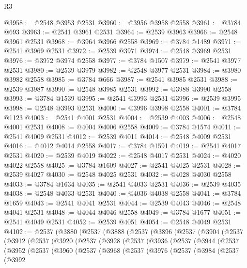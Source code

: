 \begin{lexlean}{R3}
\begin{coremodule}
@3958 := @2548 @3953 @2531
@3960 := @3956 @3958 @2558
@3961 := @3784 @693
@3963 := @2541 @3961 @2531
@3964 := @2539 @3963
@3966 := @2548 @3961 @2531
@3968 := @3964 @3966 @2558
@3969 := @3784 @1489
@3971 := @2541 @3969 @2531
@3972 := @2539 @3971
@3974 := @2548 @3969 @2531
@3976 := @3972 @3974 @2558
@3977 := @3784 @1507
@3979 := @2541 @3977 @2531
@3980 := @2539 @3979
@3982 := @2548 @3977 @2531
@3984 := @3980 @3982 @2558
@3985 := @3784 @666
@3987 := @2541 @3985 @2531
@3988 := @2539 @3987
@3990 := @2548 @3985 @2531
@3992 := @3988 @3990 @2558
@3993 := @3784 @1539
@3995 := @2541 @3993 @2531
@3996 := @2539 @3995
@3998 := @2548 @3993 @2531
@4000 := @3996 @3998 @2558
@4001 := @3784 @1123
@4003 := @2541 @4001 @2531
@4004 := @2539 @4003
@4006 := @2548 @4001 @2531
@4008 := @4004 @4006 @2558
@4009 := @3784 @1574
@4011 := @2541 @4009 @2531
@4012 := @2539 @4011
@4014 := @2548 @4009 @2531
@4016 := @4012 @4014 @2558
@4017 := @3784 @1591
@4019 := @2541 @4017 @2531
@4020 := @2539 @4019
@4022 := @2548 @4017 @2531
@4024 := @4020 @4022 @2558
@4025 := @3784 @1609
@4027 := @2541 @4025 @2531
@4028 := @2539 @4027
@4030 := @2548 @4025 @2531
@4032 := @4028 @4030 @2558
@4033 := @3784 @1634
@4035 := @2541 @4033 @2531
@4036 := @2539 @4035
@4038 := @2548 @4033 @2531
@4040 := @4036 @4038 @2558
@4041 := @3784 @1659
@4043 := @2541 @4041 @2531
@4044 := @2539 @4043
@4046 := @2548 @4041 @2531
@4048 := @4044 @4046 @2558
@4049 := @3784 @1677
@4051 := @2541 @4049 @2531
@4052 := @2539 @4051
@4054 := @2548 @4049 @2531
@4102 := @2537
    (@3880
      (@2537
        (@3888
          (@2537
            (@3896
              (@2537
                (@3904
                  (@2537
                    (@3912
                      (@2537
                        (@3920
                          (@2537
                            (@3928
                              (@2537
                                (@3936
                                  (@2537
                                    (@3944
                                      (@2537
                                        (@3952
                                          (@2537
                                            (@3960
                                              (@2537
                                                (@3968
                                                  (@2537
                                                    (@3976
                                                      (@2537
                                                        (@3984
                                                          (@2537
                                                            (@3992

\end{coremodule}
\end{lexlean}
